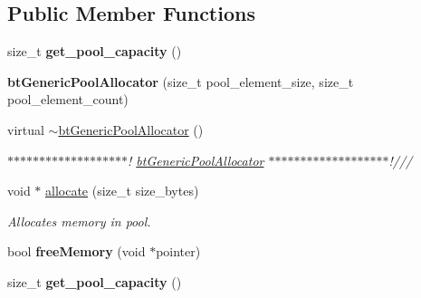 \subsection*{Public Member Functions}
\begin{DoxyCompactItemize}
\item 
\mbox{\label{classbtGenericPoolAllocator_ab34f82358157fb84815facf548a7ed44}} 
size\+\_\+t {\bfseries get\+\_\+pool\+\_\+capacity} ()
\item 
\mbox{\label{classbtGenericPoolAllocator_abf2f5fb4394dff12a92005fc579f866e}} 
{\bfseries bt\+Generic\+Pool\+Allocator} (size\+\_\+t pool\+\_\+element\+\_\+size, size\+\_\+t pool\+\_\+element\+\_\+count)
\item 
\mbox{\label{classbtGenericPoolAllocator_a3d92133ad713c674e5102bfd2ca2d66a}} 
virtual \hyperlink{classbtGenericPoolAllocator_a3d92133ad713c674e5102bfd2ca2d66a}{$\sim$bt\+Generic\+Pool\+Allocator} ()
\begin{DoxyCompactList}\small\item\em $\ast$$\ast$$\ast$$\ast$$\ast$$\ast$$\ast$$\ast$$\ast$$\ast$$\ast$$\ast$$\ast$$\ast$$\ast$$\ast$$\ast$$\ast$$\ast$! \hyperlink{classbtGenericPoolAllocator}{bt\+Generic\+Pool\+Allocator} $\ast$$\ast$$\ast$$\ast$$\ast$$\ast$$\ast$$\ast$$\ast$$\ast$$\ast$$\ast$$\ast$$\ast$$\ast$$\ast$$\ast$$\ast$$\ast$!/// \end{DoxyCompactList}\item 
void $\ast$ \hyperlink{classbtGenericPoolAllocator_ae07307fd61ffa9ce47b5f198b87d17e1}{allocate} (size\+\_\+t size\+\_\+bytes)
\begin{DoxyCompactList}\small\item\em Allocates memory in pool. \end{DoxyCompactList}\item 
\mbox{\label{classbtGenericPoolAllocator_a6904f973aef630798a87f0e6dd37e93c}} 
bool {\bfseries free\+Memory} (void $\ast$pointer)
\item 
\mbox{\label{classbtGenericPoolAllocator_ab34f82358157fb84815facf548a7ed44}} 
size\+\_\+t {\bfseries get\+\_\+pool\+\_\+capacity} ()
\item 
\mbox{\label{classbtGenericPoolAllocator_abf2f5fb4394dff12a92005fc579f866e}} 

\end{DoxyCompactItemize}
